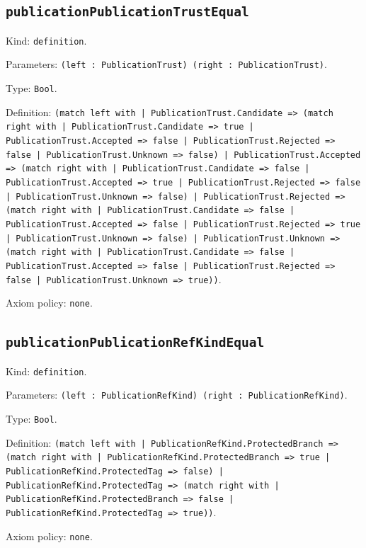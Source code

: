 \documentclass[11pt]{article}
\begin{document}
\subsection*{\texttt{publicationPublicationTrustEqual}}
\noindent Kind: \texttt{definition}.\par
\noindent Parameters: \texttt{(left : PublicationTrust) (right : PublicationTrust)}.\par
\noindent Type: \texttt{Bool}.\par
\noindent Definition: \texttt{(match left with | PublicationTrust.Candidate => (match right with | PublicationTrust.Candidate => true | PublicationTrust.Accepted => false | PublicationTrust.Rejected => false | PublicationTrust.Unknown => false) | PublicationTrust.Accepted => (match right with | PublicationTrust.Candidate => false | PublicationTrust.Accepted => true | PublicationTrust.Rejected => false | PublicationTrust.Unknown => false) | PublicationTrust.Rejected => (match right with | PublicationTrust.Candidate => false | PublicationTrust.Accepted => false | PublicationTrust.Rejected => true | PublicationTrust.Unknown => false) | PublicationTrust.Unknown => (match right with | PublicationTrust.Candidate => false | PublicationTrust.Accepted => false | PublicationTrust.Rejected => false | PublicationTrust.Unknown => true))}.\par
\noindent Axiom policy: \texttt{none}.\par
\subsection*{\texttt{publicationPublicationRefKindEqual}}
\noindent Kind: \texttt{definition}.\par
\noindent Parameters: \texttt{(left : PublicationRefKind) (right : PublicationRefKind)}.\par
\noindent Type: \texttt{Bool}.\par
\noindent Definition: \texttt{(match left with | PublicationRefKind.ProtectedBranch => (match right with | PublicationRefKind.ProtectedBranch => true | PublicationRefKind.ProtectedTag => false) | PublicationRefKind.ProtectedTag => (match right with | PublicationRefKind.ProtectedBranch => false | PublicationRefKind.ProtectedTag => true))}.\par
\noindent Axiom policy: \texttt{none}.\par
\end{document}
